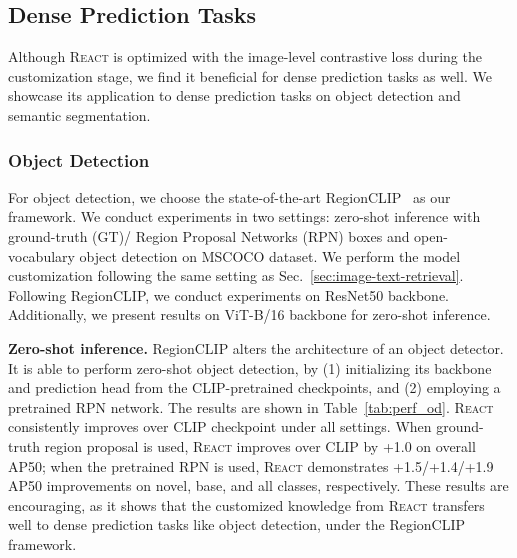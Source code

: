\documentclass[10pt,twocolumn,letterpaper]{article}
\renewcommand{\paragraph}[1]{\vspace{1.25mm}\noindent\textbf{#1}}
\newcommand{\shortname}{\textsc{React}}
\begin{document}
\subsection{Dense Prediction Tasks}
\label{sec:dense_prediction}

Although \shortname{} is optimized with the image-level contrastive loss during the customization stage, we find it beneficial for dense prediction tasks as well.  We showcase its application to dense prediction tasks on object detection and semantic segmentation.

\subsubsection{Object Detection}
\label{sec:object_detection}

For object detection, we choose the state-of-the-art RegionCLIP~\cite{zhong2021regionclip} as our framework.  We conduct experiments in two settings: zero-shot inference with ground-truth (GT)/ Region Proposal Networks (RPN) boxes and open-vocabulary object detection on MSCOCO dataset.  We perform the model customization following the same setting as Sec.~\ref{sec:image-text-retrieval}.  Following RegionCLIP, we conduct experiments on ResNet50 backbone.  Additionally, we present results on ViT-B/16 backbone for zero-shot inference.

\paragraph{Zero-shot inference.}
RegionCLIP alters the architecture of an object detector. It is able to perform zero-shot object detection, by (1) initializing its backbone and prediction head from the CLIP-pretrained checkpoints, and  (2) employing a pretrained RPN network.
The results are shown in Table~\ref{tab:perf_od}. \shortname{} consistently improves over CLIP checkpoint under all settings.
When ground-truth region proposal is used, \shortname{} improves over CLIP by +1.0 on overall AP50; when the pretrained RPN is used, \shortname{} demonstrates +1.5/+1.4/+1.9 AP50 improvements on novel, base, and all classes, respectively.
These results are encouraging, as it shows that the customized knowledge from \shortname{} transfers well to dense prediction tasks like object detection, under the RegionCLIP framework.
\end{document}
